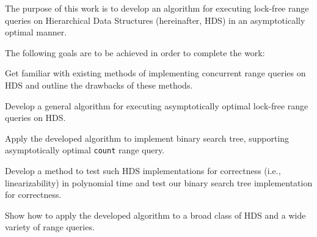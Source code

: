 \documentclass[times, dvipsnames,%
               languages={russian,english} %
              ]{itmo-student-thesis}
\begin{document}


\tableofcontents

\startprefacepage

The purpose of this work is to develop an algorithm for executing lock-free range queries on Hierarchical Data Structures (hereinafter, HDS) in an asymptotically optimal manner.

\bigbreak

The following goals are to be achieved in order to complete the work:

\begin{nenum}
    \item Get familiar with existing methods of implementing concurrent range queries on HDS and outline the drawbacks of these methods.
    \item Develop a general algorithm for executing asymptotically optimal lock-free range queries on HDS.
    \item Apply the developed algorithm to implement binary search tree, supporting asymptotically optimal \texttt{count} range query.
    \item Develop a method to test such HDS implementations for correctness (i.e., linearizability) in polynomial time and test our binary search tree implementation for correctness.
    \item Show how to apply the developed algorithm to a broad class of HDS and a wide variety of range queries.
\end{nenum}

\bigbreak
\end{document}
